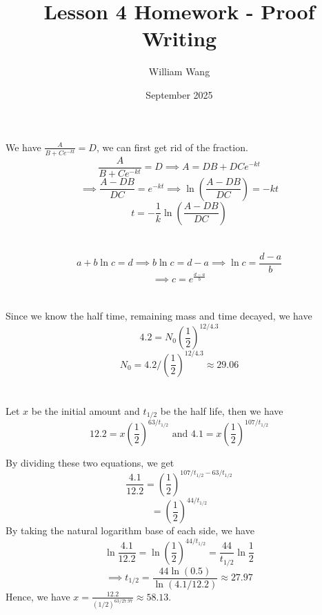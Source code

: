 \documentclass{article}
\title{Lesson 4 Homework - Proof Writing}
\author{William Wang}
\date{September 2025}
\begin{document}
\maketitle

\section{}
We have \(\frac{A}{B+Ce^{-kt}} = D\), we can first get rid of the fraction. 
\[\frac{A}{B+Ce^{-kt}} = D \implies A = DB+DCe^{-kt}\]
\[\implies \frac{A-DB}{DC} = e^{-kt} \implies \ln(\frac{A-DB}{DC}) = -kt\]
\[t = -\frac{1}{k}\ln(\frac{A-DB}{DC})\]
\section{}
\[a+b\ln c = d \implies b\ln c = d-a \implies \ln c = \frac{d-a}{b}\]
\[\implies c = e^{\frac{d-a}{b}}\]
\section{}
Since we know the half time, remaining mass and time decayed, we have
\[4.2 = N_0(\frac{1}{2})^{12/4.3}\]
\[N_0 = 4.2/(\frac{1}{2})^{12/4.3} \approx 29.06\]
\section{}
Let $x$ be the initial amount and $t_{1/2}$ be the half life, then we have 
\[12.2 = x(\frac{1}{2})^{63/t_{1/2}} \text{ and } 4.1 = x(\frac{1}{2})^{107/t_{1/2}}\]

By dividing these two equations, we get
\[\frac{4.1}{12.2} = (\frac{1}{2})^{107/t_{1/2} - 63/t_{1/2}}\]
\[= (\frac{1}{2})^{44/t_{1/2}}\]
By taking the natural logarithm base of each side, we have
\[\ln \frac{4.1}{12.2} = \ln(\frac{1}{2})^{44/t_{1/2}} = \frac{44}{t_{1/2}}\ln \frac{1}{2}\]
\[\implies t_{1/2} = \frac{44\ln(0.5)}{\ln(4.1/12.2)} \approx 27.97\]
Hence, we have \(x = \frac{12.2}{(1/2)^{63/27.97}} \approx 58.13 \). 
\end{document}
